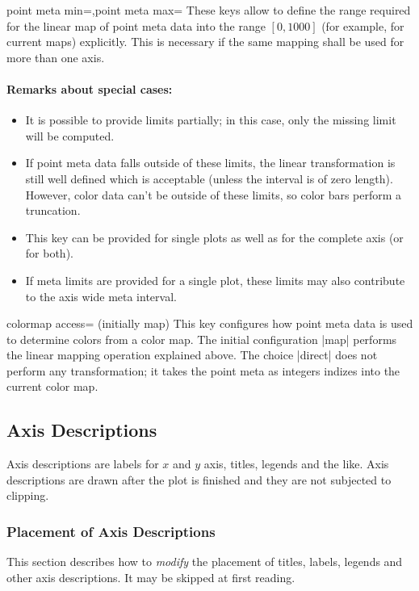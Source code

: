 \begin{pgfplotskeylist}{point meta min=,point meta max=}
	These keys allow to define the range required for the linear map of point meta data into the range $[0,1000]$ (for example, for current maps) explicitly. This is necessary if the same mapping shall be used for more than one axis.

	\paragraph{Remarks about special cases:}
	\begin{itemize}
		\item It is possible to provide limits partially; in this case, only the missing limit will be computed.
		\item If point meta data falls outside of these limits, the linear transformation is still well defined which is acceptable (unless the interval is of zero length). However, color data can't be outside of these limits, so color bars perform a truncation.
		\item This key can be provided for single plots as well as for the complete axis (or for both).
		\item If meta limits are provided for a single plot, these limits may also contribute to the axis wide meta interval.
	\end{itemize}
\end{pgfplotskeylist}

\begin{pgfplotskey}{colormap access= (initially map)}
	This key configures how point meta data is used to determine colors from a color map. The initial configuration |map| performs the linear mapping operation explained above. The choice |direct| does not perform any transformation; it takes the point meta as integers indizes into the current color map. 
\end{pgfplotskey}



\subsection{Axis Descriptions}
Axis descriptions are labels for $x$ and $y$ axis, titles, legends and the like. Axis descriptions are drawn after the plot is finished and they are not subjected to clipping. 

\subsubsection{Placement of Axis Descriptions}
This section describes how to \emph{modify} the placement of titles, labels, legends and other axis descriptions. It may be skipped at first reading.

